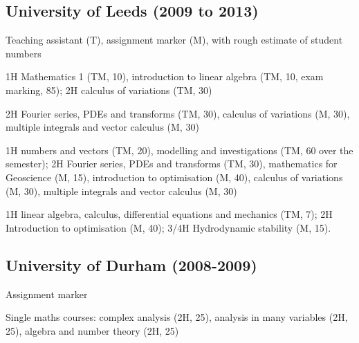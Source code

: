 \documentclass[letterpaper]{article}
\renewenvironment{itemize}{
  \begin{list}{}{
    \setlength{\leftmargin}{1.5em}
  }
}{
  \end{list}
}
\begin{document}
\subsection*{University of Leeds (2009 to 2013)}
\begin{itemize}
\item Teaching assistant (T), assignment marker (M), with rough estimate of
student numbers
\begin{itemize}
	\item[12/13:] 1H Mathematics 1 (TM, 10), introduction to linear algebra (TM, 10, exam marking, 85); 2H calculus of variations (TM, 30)
	\item[11/12:] 2H Fourier series, PDEs and transforms (TM, 30), calculus of variations (M, 30), multiple integrals and vector calculus (M, 30)
	\item[10/11:] 1H numbers and vectors (TM, 20), modelling and investigations (TM, 60 over the semester); 2H Fourier series, PDEs and transforms (TM, 30), mathematics for Geoscience (M, 15), introduction to optimisation (M, 40), calculus of variations (M, 30), multiple integrals and vector calculus (M, 30)
	\item[09/10:] 1H linear algebra, calculus, differential equations and mechanics (TM, 7); 2H Introduction to optimisation (M, 40); 3/4H Hydrodynamic stability (M, 15).
\end{itemize}
\end{itemize}


\subsection*{University of Durham (2008-2009)}
\begin{itemize}
\item Assignment marker
\begin{itemize}
	\item[--] Single maths courses: complex analysis (2H, 25), analysis in many
	variables (2H, 25), algebra and number theory (2H, 25)
\end{itemize}
\end{itemize}

\end{document}
